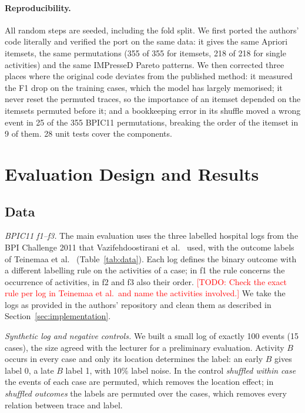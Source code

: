 \documentclass{article}
\newcommand{\todo}[1]{\textcolor{red}{[TODO: #1]}}
\newcommand{\tbd}{\textcolor{red}{tbd}}
\begin{document}
\paragraph{Reproducibility.}
All random steps are seeded, including the fold split. We first ported the authors' code literally and verified the port on the same data: it gives the same Apriori itemsets, the same permutations (355 of 355 for itemsets, 218 of 218 for single activities) and the same IMPresseD Pareto patterns. We then corrected three places where the original code deviates from the published method: it measured the F1 drop on the training cases, which the model has largely memorised; it never reset the permuted traces, so the importance of an itemset depended on the itemsets permuted before it; and a bookkeeping error in its shuffle moved a wrong event in 25 of the 355 BPIC11 permutations, breaking the order of the itemset in 9 of them. 28 unit tests cover the components.



\section{Evaluation Design and Results}
\label{sec:evaluation}

\subsection{Data}

\emph{BPIC11 f1--f3.} The main evaluation uses the three labelled hospital logs from the BPI Challenge 2011 that Vazifehdoostirani et al.~\cite{vazifehdoostirani2024} used, with the outcome labels of Teinemaa et al.~\cite{teinemaa2019} (Table~\ref{tab:data}). Each log defines the binary outcome with a different labelling rule on the activities of a case; in f1 the rule concerns the occurrence of activities, in f2 and f3 also their order. \todo{Check the exact rule per log in Teinemaa et al.\ and name the activities involved.} We take the logs as provided in the authors' repository and clean them as described in Section~\ref{sec:implementation}.

\emph{Synthetic log and negative controls.} We built a small log of exactly 100 events (15 cases), the size agreed with the lecturer for a preliminary evaluation. Activity $B$ occurs in every case and only its location determines the label: an early $B$ gives label 0, a late $B$ label 1, with 10\% label noise. In the control \emph{shuffled within case} the events of each case are permuted, which removes the location effect; in \emph{shuffled outcomes} the labels are permuted over the cases, which removes every relation between trace and label.
\end{document}
